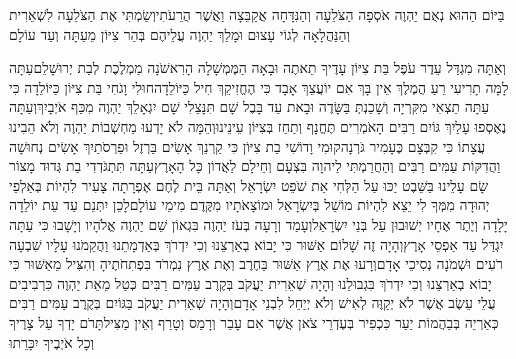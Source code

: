 \documentclass[../main/main.tex]{subfiles}
\begin{document}
\begin{multicols}{\ncols}
בַּיּוֹם הַהוּא נְאֻם יַהְוֶה אֹסְפָה הַצֹּלֵעָה וְהַנִּדָּחָה אֲקַבֵּצָה וַאֲשֶׁר הֲרֵעֹתִי\PreVerseSpace{}וְשַׂמְתִּי אֶת הַצֹּלֵעָה לִשְׁאֵרִית וְהַנַּהֲלָאָה לְגוֹי עָצוּם וּמָלַךְ יַהְוֶה עֲלֵיהֶם בְּהַר צִיּוֹן מֵעַתָּה וְעַד עוֹלָם\OpenSection{}\par
{}וְאַתָּה מִגְדַּל עֵדֶר עֹפֶל בַּת צִיּוֹן עָדֶיךָ תֵאתֶה וּבָאָה הַמֶּמְשָׁלָה הָרִאשֹׁנָה מַמְלֶכֶת לְבַת יְרוּשָׁלֵם\PreVerseSpace{}עַתָּה לָמָּה תָרִיעִי רֵעַ הֲמֶלֶךְ אֵין בָּךְ אִם יוֹעֲצֵךְ אָבָד כִּי הֶחֱזִיקֵךְ חִיל כַּיּוֹלֵדָה\PreVerseSpace{}חוּלִי וָגֹחִי בַּת צִיּוֹן כַּיּוֹלֵדָה כִּי עַתָּה תֵצְאִי מִקִּרְיָה וְשָׁכַנְתְּ בַּשָּׂדֶה וּבָאת עַד בָּבֶל שָׁם תִּנָּצֵלִי שָׁם יִגְאָלֵךְ יַהְוֶה מִכַּף אֹיְבָיִךְ\PreVerseSpace{}וְעַתָּה נֶאֶסְפוּ עָלַיִךְ גּוֹיִם רַבִּים הָאֹמְרִים תֶּחֱנָף וְתַחַז בְּצִיּוֹן עֵינֵינוּ\PreVerseSpace{}וְהֵמָּה לֹא יָדְעוּ מַחְשְׁבוֹת יַהְוֶה וְלֹא הֵבִינוּ עֲצָתוֹ כִּי קִבְּצָם כֶּעָמִיר גֹּרְנָה\PreVerseSpace{}קוּמִי וָדוֹשִׁי בַת צִיּוֹן כִּי קַרְנֵךְ אָשִׂים בַּרְזֶל וּפַרְסֹתַיִךְ אָשִׂים נְחוּשָׁה וַהֲדִקּוֹת עַמִּים רַבִּים וְהַחֲרַמְתִּי לַיהוָה בִּצְעָם וְחֵילָם לַאֲדוֹן כָּל הָאָרֶץ\PreVerseSpace{}עַתָּה תִּתְגֹּדְדִי בַת גְּדוּד מָצוֹר שָׂם עָלֵינוּ בַּשֵּׁבֶט יַכּוּ עַל הַלְּחִי אֵת שֹׁפֵט יִשְׂרָאֵל \ClosedSection{}וְאַתָּה בֵּית לֶחֶם אֶפְרָתָה צָעִיר לִהְיוֹת בְּאַלְפֵי יְהוּדָה מִמְּךָ לִי יֵצֵא לִהְיוֹת מוֹשֵׁל בְּיִשְׂרָאֵל וּמוֹצָאֹתָיו מִקֶּדֶם מִימֵי עוֹלָם\PreVerseSpace{}לָכֵן יִתְּנֵם עַד עֵת יוֹלֵדָה יָלָדָה וְיֶתֶר אֶחָיו יְשׁוּבוּן עַל בְּנֵי יִשְׂרָאֵל\PreVerseSpace{}וְעָמַד וְרָעָה בְּעֹז יַהְוֶה בִּגְאוֹן שֵׁם יַהְוֶה אֱלֹהָיו וְיָשָׁבוּ כִּי עַתָּה יִגְדַּל עַד אַפְסֵי אָרֶץ\PreVerseSpace{}וְהָיָה זֶה שָׁלוֹם אַשּׁוּר כִּי יָבוֹא בְאַרְצֵנוּ וְכִי יִדְרֹךְ בְּאַדְמָתֵנוּ\SubEnd{} וַהֲקֵמֹנוּ עָלָיו שִׁבְעָה רֹעִים וּשְׁמֹנָה נְסִיכֵי אָדָם\PreVerseSpace{}וְרָעוּ אֶת אֶרֶץ אַשּׁוּר בַּחֶרֶב וְאֶת אֶרֶץ נִמְרֹד בִּפְתִחֹתֶיהָ\SubEnd{} וְהִצִּיל מֵאַשּׁוּר כִּי יָבוֹא בְאַרְצֵנוּ וְכִי יִדְרֹךְ בִּגְבוּלֵנוּ \ClosedSection{}וְהָיָה שְׁאֵרִית יַעֲקֹב בְּקֶרֶב עַמִּים רַבִּים כְּטַל מֵאֵת יַהְוֶה כִּרְבִיבִים עֲלֵי עֵשֶׂב אֲשֶׁר לֹא יְקַוֶּה לְאִישׁ וְלֹא יְיַחֵל לִבְנֵי אָדָם\PreVerseSpace{}וְהָיָה שְׁאֵרִית יַעֲקֹב בַּגּוֹיִם בְּקֶרֶב עַמִּים רַבִּים כְּאַרְיֵה בְּבַהֲמוֹת יַעַר כִּכְפִיר בְּעֶדְרֵי צֹאן אֲשֶׁר אִם עָבַר וְרָמַס וְטָרַף וְאֵין מַצִּיל\PreVerseSpace{}תָּרֹם יָדְךָ עַל צָרֶיךָ וְכָל אֹיְבֶיךָ יִכָּרֵתוּ\OpenSection{}\par

\end{multicols}
\end{document}
